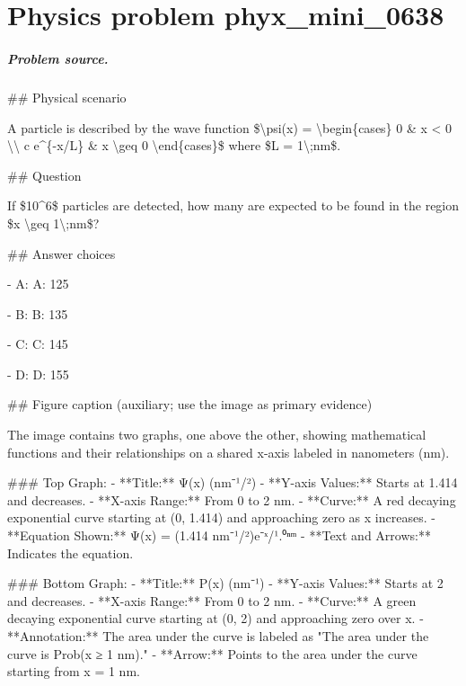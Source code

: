 
\chapter{Physics problem phyx\_mini\_0638}
\label{ch:PhyXMiniProblems_problem_phyx_mini_0638}

\paragraph{Problem source.}
\#\# Physical scenario

A particle is described by the wave function \$\textbackslash{}psi(x) = \textbackslash{}begin\{cases\} 0 \& x < 0 \textbackslash{}\textbackslash{} c e\textasciicircum{}\{-x/L\} \& x \textbackslash{}geq 0 \textbackslash{}end\{cases\}\$ where \$L = 1\textbackslash{};nm\$.

\#\# Question

If \$10\textasciicircum{}6\$ particles are detected, how many are expected to be found in the region \$x \textbackslash{}geq 1\textbackslash{};nm\$?

\#\# Answer choices

- A: A: 125

- B: B: 135

- C: C: 145

- D: D: 155

\#\# Figure caption (auxiliary; use the image as primary evidence)

The image contains two graphs, one above the other, showing mathematical functions and their relationships on a shared x-axis labeled in nanometers (nm).

\#\#\# Top Graph:
- **Title:** Ψ(x) (nm⁻¹/²)
- **Y-axis Values:** Starts at 1.414 and decreases.
- **X-axis Range:** From 0 to 2 nm.
- **Curve:** A red decaying exponential curve starting at (0, 1.414) and approaching zero as x increases.
- **Equation Shown:** Ψ(x) = (1.414 nm⁻¹/²)e⁻ˣ/¹.⁰ⁿᵐ
- **Text and Arrows:** Indicates the equation.

\#\#\# Bottom Graph:
- **Title:** P(x) (nm⁻¹)
- **Y-axis Values:** Starts at 2 and decreases.
- **X-axis Range:** From 0 to 2 nm.
- **Curve:** A green decaying exponential curve starting at (0, 2) and approaching zero over x.
- **Annotation:** The area under the curve is labeled as "The area under the curve is Prob(x ≥ 1 nm)."
- **Arrow:** Points to the area under the curve starting from x = 1 nm.

